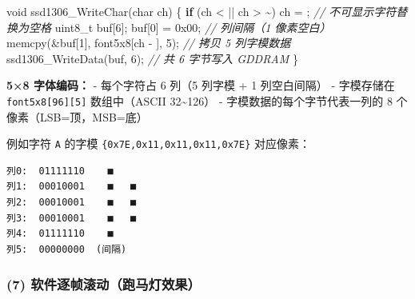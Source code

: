 \documentclass[
  chinese,
  UTF8,
  oneside,
  openany]{ctexbook}
\newenvironment{Shaded}{}{}
\newcommand{\BaseNTok}[1]{\textcolor[rgb]{0.25,0.63,0.44}{#1}}
\newcommand{\CharTok}[1]{\textcolor[rgb]{0.25,0.44,0.63}{#1}}
\newcommand{\CommentTok}[1]{\textcolor[rgb]{0.38,0.63,0.69}{\textit{#1}}}
\newcommand{\ControlFlowTok}[1]{\textcolor[rgb]{0.00,0.44,0.13}{\textbf{#1}}}
\newcommand{\DataTypeTok}[1]{\textcolor[rgb]{0.56,0.13,0.00}{#1}}
\newcommand{\DecValTok}[1]{\textcolor[rgb]{0.25,0.63,0.44}{#1}}
\newcommand{\NormalTok}[1]{#1}
\newcommand{\OperatorTok}[1]{\textcolor[rgb]{0.40,0.40,0.40}{#1}}
\begin{document}
\begin{Shaded}
\begin{Highlighting}[]
\DataTypeTok{void}\NormalTok{ ssd1306\_WriteChar}\OperatorTok{(}\DataTypeTok{char}\NormalTok{ ch}\OperatorTok{)}
\OperatorTok{\{}
    \ControlFlowTok{if} \OperatorTok{(}\NormalTok{ch }\OperatorTok{\textless{}} \CharTok{\textquotesingle{} \textquotesingle{}} \OperatorTok{||}\NormalTok{ ch }\OperatorTok{\textgreater{}} \CharTok{\textquotesingle{}\textasciitilde{}\textquotesingle{}}\OperatorTok{)}\NormalTok{ ch }\OperatorTok{=} \CharTok{\textquotesingle{} \textquotesingle{}}\OperatorTok{;}  \CommentTok{// 不可显示字符替换为空格}
    \DataTypeTok{uint8\_t}\NormalTok{ buf}\OperatorTok{[}\DecValTok{6}\OperatorTok{];}
\NormalTok{    buf}\OperatorTok{[}\DecValTok{0}\OperatorTok{]} \OperatorTok{=} \BaseNTok{0x00}\OperatorTok{;}                         \CommentTok{// 列间隔（1 像素空白）}
\NormalTok{    memcpy}\OperatorTok{(\&}\NormalTok{buf}\OperatorTok{[}\DecValTok{1}\OperatorTok{],}\NormalTok{ font5x8}\OperatorTok{[}\NormalTok{ch }\OperatorTok{{-}} \CharTok{\textquotesingle{} \textquotesingle{}}\OperatorTok{],} \DecValTok{5}\OperatorTok{);} \CommentTok{// 拷贝 5 列字模数据}
\NormalTok{    ssd1306\_WriteData}\OperatorTok{(}\NormalTok{buf}\OperatorTok{,} \DecValTok{6}\OperatorTok{);}             \CommentTok{// 共 6 字节写入 GDDRAM}
\OperatorTok{\}}
\end{Highlighting}
\end{Shaded}

\textbf{5×8 字体编码：} - 每个字符占 6 列（5 列字模 + 1 列空白间隔） -
字模存储在 \texttt{font5x8{[}96{]}{[}5{]}} 数组中（ASCII
32\textasciitilde126） - 字模数据的每个字节代表一列的 8
个像素（LSB=顶，MSB=底）

例如字符 \texttt{\textquotesingle{}A\textquotesingle{}} 的字模
\texttt{\{0x7E,0x11,0x11,0x11,0x7E\}} 对应像素：

\begin{verbatim}
列0:  01111110    ■
列1:  00010001    ■   ■
列2:  00010001    ■   ■
列3:  00010001    ■   ■
列4:  01111110    ■
列5:  00000000  (间隔)
\end{verbatim}

\subsubsection{(7)
软件逐帧滚动（跑马灯效果）}\label{ux8f6fux4ef6ux9010ux5e27ux6edaux52a8ux8dd1ux9a6cux706fux6548ux679c}
\end{document}
